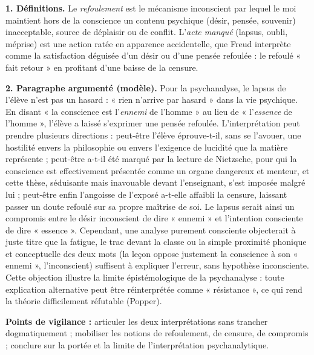 \documentclass[11pt]{article}
\begin{document}
\begin{corrige}
\textbf{1. Définitions.} Le \emph{refoulement} est le mécanisme inconscient par lequel le moi maintient hors de la conscience un contenu psychique (désir, pensée, souvenir) inacceptable, source de déplaisir ou de conflit. L'\emph{acte manqué} (lapsus, oubli, méprise) est une action ratée en apparence accidentelle, que Freud interprète comme la satisfaction déguisée d'un désir ou d'une pensée refoulée : le refoulé « fait retour » en profitant d'une baisse de la censure.

\textbf{2. Paragraphe argumenté (modèle).} Pour la psychanalyse, le lapsus de l'élève n'est pas un hasard : « rien n'arrive par hasard » dans la vie psychique. En disant « la conscience est l'\emph{ennemi} de l'homme » au lieu de « l'\emph{essence} de l'homme », l'élève a laissé s'exprimer une pensée refoulée. L'interprétation peut prendre plusieurs directions : peut-être l'élève éprouve-t-il, sans se l'avouer, une hostilité envers la philosophie ou envers l'exigence de lucidité que la matière représente ; peut-être a-t-il été marqué par la lecture de Nietzsche, pour qui la conscience est effectivement présentée comme un organe dangereux et menteur, et cette thèse, séduisante mais inavouable devant l'enseignant, s'est imposée malgré lui ; peut-être enfin l'angoisse de l'exposé a-t-elle affaibli la censure, laissant passer un doute refoulé sur sa propre maîtrise de soi. Le lapsus serait ainsi un compromis entre le désir inconscient de dire « ennemi » et l'intention consciente de dire « essence ». Cependant, une analyse purement consciente objecterait à juste titre que la fatigue, le trac devant la classe ou la simple proximité phonique et conceptuelle des deux mots (la leçon oppose justement la conscience à son « ennemi », l'inconscient) suffisent à expliquer l'erreur, sans hypothèse inconsciente. Cette objection illustre la limite épistémologique de la psychanalyse : toute explication alternative peut être réinterprétée comme « résistance », ce qui rend la théorie difficilement réfutable (Popper).

\textbf{Points de vigilance :} articuler les deux interprétations sans trancher dogmatiquement ; mobiliser les notions de refoulement, de censure, de compromis ; conclure sur la portée et la limite de l'interprétation psychanalytique.
\end{corrige}
\end{document}
